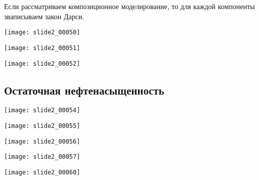 \documentclass[main.tex]{subfiles}
\begin{document}
Если рассматриваем композиционное моделирование, то для каждой компоненты зваписываем закон Дарси.

\texttt{[image: slide2\_00050]}

\texttt{[image: slide2\_00051]}

\texttt{[image: slide2\_00052]}

\subsection{Остаточная нефтенасыщенность}

\texttt{[image: slide2\_00054]}

\texttt{[image: slide2\_00055]}

\texttt{[image: slide2\_00056]}

\texttt{[image: slide2\_00057]}

\texttt{[image: slide2\_00060]}
\end{document}
